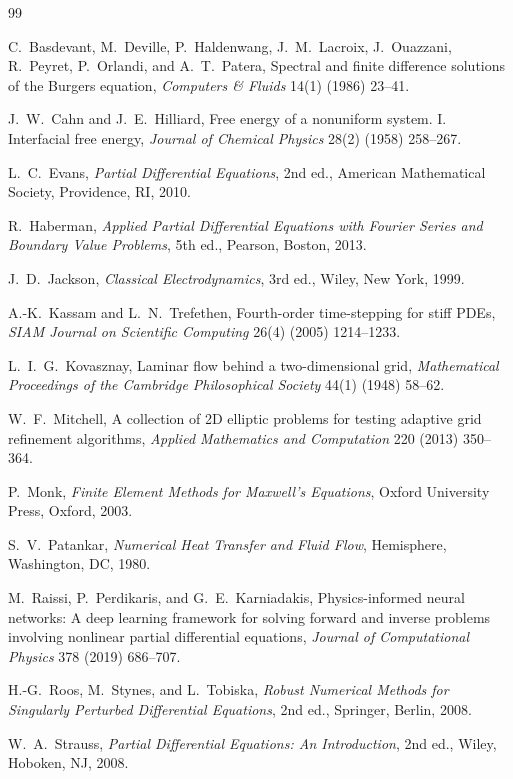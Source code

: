 \documentclass[11pt]{article}
\begin{document}
\begin{thebibliography}{99}

C.~Basdevant, M.~Deville, P.~Haldenwang, J.~M.~Lacroix, J.~Ouazzani,
R.~Peyret, P.~Orlandi, and A.~T.~Patera,
Spectral and finite difference solutions of the Burgers equation,
\emph{Computers \& Fluids} 14(1) (1986) 23--41.

J.~W.~Cahn and J.~E.~Hilliard,
Free energy of a nonuniform system. I. Interfacial free energy,
\emph{Journal of Chemical Physics} 28(2) (1958) 258--267.

L.~C.~Evans,
\emph{Partial Differential Equations}, 2nd ed.,
American Mathematical Society, Providence, RI, 2010.

R.~Haberman,
\emph{Applied Partial Differential Equations with Fourier Series and
Boundary Value Problems}, 5th ed., Pearson, Boston, 2013.

J.~D.~Jackson,
\emph{Classical Electrodynamics}, 3rd ed., Wiley, New York, 1999.

A.-K.~Kassam and L.~N.~Trefethen,
Fourth-order time-stepping for stiff PDEs,
\emph{SIAM Journal on Scientific Computing} 26(4) (2005) 1214--1233.

L.~I.~G.~Kovasznay,
Laminar flow behind a two-dimensional grid,
\emph{Mathematical Proceedings of the Cambridge Philosophical Society}
44(1) (1948) 58--62.

W.~F.~Mitchell,
A collection of 2D elliptic problems for testing adaptive grid
refinement algorithms,
\emph{Applied Mathematics and Computation} 220 (2013) 350--364.

P.~Monk,
\emph{Finite Element Methods for Maxwell's Equations},
Oxford University Press, Oxford, 2003.

S.~V.~Patankar,
\emph{Numerical Heat Transfer and Fluid Flow},
Hemisphere, Washington, DC, 1980.

M.~Raissi, P.~Perdikaris, and G.~E.~Karniadakis,
Physics-informed neural networks: A deep learning framework for solving
forward and inverse problems involving nonlinear partial differential
equations,
\emph{Journal of Computational Physics} 378 (2019) 686--707.

H.-G.~Roos, M.~Stynes, and L.~Tobiska,
\emph{Robust Numerical Methods for Singularly Perturbed Differential
Equations}, 2nd ed., Springer, Berlin, 2008.

W.~A.~Strauss,
\emph{Partial Differential Equations: An Introduction}, 2nd ed.,
Wiley, Hoboken, NJ, 2008.


\end{thebibliography}
\end{document}
